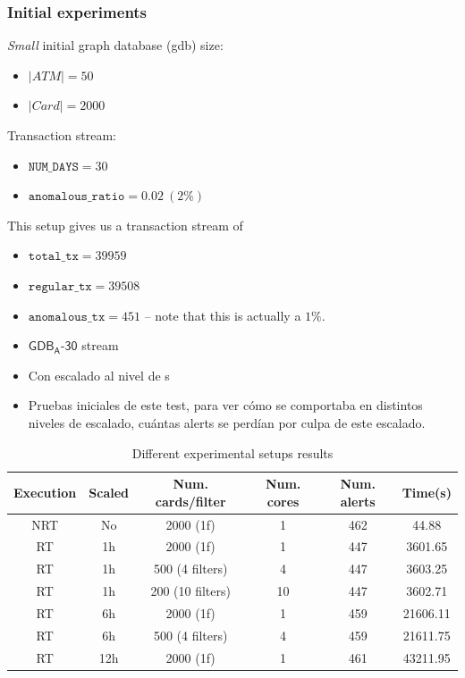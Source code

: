 \documentclass[12pt,a4paper]{article}
\begin{document}
\subsubsection{Initial experiments}

\textit{Small} initial graph database (gdb) size:
\begin{itemize}
  \item $|ATM| = 50$
  \item $|Card| = 2000$
\end{itemize}

Transaction stream:
\begin{itemize}
  \item $\texttt{NUM\_DAYS} = 30$
  \item $\texttt{anomalous\_ratio} = 0.02\ (2\%)$ 
\end{itemize}

This setup gives us a transaction stream of 
\begin{itemize}
  \item $\texttt{total\_tx} = 39959$
  \item $\texttt{regular\_tx} = 39508$
  \item $\texttt{anomalous\_tx} = 451$ -- note that this is actually a $1\%$.
\end{itemize}

\newpage
\begin{itemize}
  \item $\mathsf{GDB_A\text{-}30}$ stream
  \item Con escalado al nivel de s
  \item Pruebas iniciales de este test, para ver cómo se comportaba en distintos niveles de escalado, cuántas alerts se perdían por culpa de este escalado.
\end{itemize}
\begin{table}[H]
\centering
\begin{tabular}{|c|c|c|c|c|c|}
  \hline
  Execution & Scaled   & Num. cards/filter& Num. cores & Num. alerts & Time(s) \\ \hline
  NRT & No & 2000 (1f) & 1 & 462 & 44.88 \\ \hline
  RT  & 1h & 2000 (1f) & 1 & 447 & 3601.65\\ \hline
  RT  & 1h & 500 (4 filters) & 4 & 447 & 3603.25\\ \hline
  RT  & 1h & 200 (10 filters) & 10 & 447 & 3602.71\\ \hline
  RT  & 6h & 2000 (1f) & 1 & 459 & 21606.11 \\ \hline
  RT  & 6h & 500 (4 filters) & 4 & 459 & 21611.75 \\ \hline
  RT  & 12h & 2000 (1f) & 1 & 461 & 43211.95 \\ \hline
\end{tabular}
\caption{Different experimental setups results}
\label{table:small-results}
\end{table}
\end{document}
